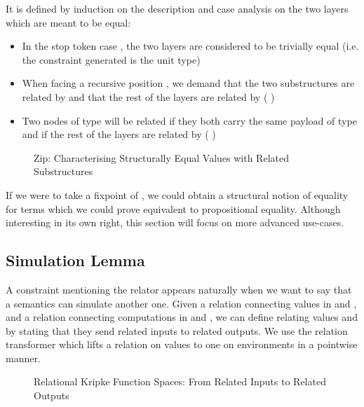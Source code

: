 It is defined by induction on the description and case analysis on the two
layers which are meant to be equal:
\begin{itemize}
  \item In the stop token case  , the two layers are considered to
    be trivially equal (i.e. the constraint generated is the unit type)
  \item When facing a recursive position { \AB{$\Delta$}  }, we
    demand that the two substructures are related by { \AB{$\Delta$} }
    and that the rest of the layers are related by (   )
  \item Two nodes of type {  } will
    be related if they both carry the same payload  of type  and if
    the rest of the layers are related by (    )
\end{itemize}

\begin{figure}[h]
\caption{Zip: Characterising Structurally Equal Values with Related Substructures}
\end{figure}

If we were to take a fixpoint of , we could obtain a structural
notion of equality for terms which we could prove equivalent to propositional
equality. Although interesting in its own right, this section will focus
on more advanced use-cases.



\subsection{Simulation Lemma}\label{section:simulation}

A constraint mentioning the relator appears naturally when we want to say that a
semantics can simulate another one. Given a relation  connecting values
in  and , and a relation  connecting computations in
 and , we can define  relating values
   and   
by stating that they send related inputs to related outputs. We use
the relation transformer  which lifts a relation on values
to one on environments in a pointwise manner.

\begin{figure}[h]
\caption{Relational Kripke Function Spaces: From Related Inputs to Related Outputs}
\end{figure}

